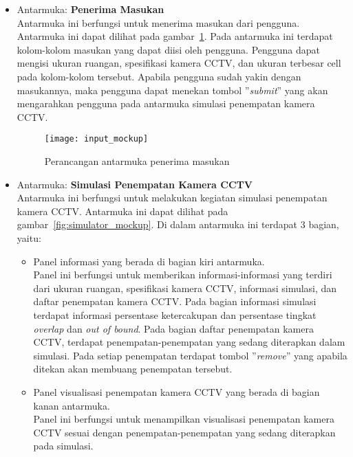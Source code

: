 \begin{itemize}
	\item Antarmuka: \textbf{Penerima Masukan}\\
	Antarmuka ini berfungsi untuk menerima masukan dari pengguna. Antarmuka ini dapat dilihat pada gambar~\ref{fig:input_mockup}. Pada antarmuka ini terdapat kolom-kolom masukan yang dapat diisi oleh pengguna. Pengguna dapat mengisi ukuran ruangan, spesifikasi kamera CCTV, dan ukuran terbesar cell pada kolom-kolom tersebut. Apabila pengguna sudah yakin dengan masukannya, maka pengguna dapat menekan tombol ''\textit{submit}'' yang akan mengarahkan pengguna pada antarmuka simulasi penempatan kamera CCTV.
	\begin{figure}[h]
		\centering  
		\texttt{[image: input\_mockup]}
		\caption[Perancangan antarmuka penerima masukan]{Perancangan antarmuka penerima masukan}
		\label{fig:input_mockup}
	\end{figure}

	\item Antarmuka: \textbf{Simulasi Penempatan Kamera CCTV}\\
	Antarmuka ini berfungsi untuk melakukan kegiatan simulasi penempatan kamera CCTV. Antarmuka ini dapat dilihat pada gambar~\ref{fig:simulator_mockup}. Di dalam antarmuka ini terdapat 3 bagian, yaitu:
	\begin{itemize}
		\item Panel informasi yang berada di bagian kiri antarmuka.\\
		Panel ini berfungsi untuk memberikan informasi-informasi yang terdiri dari ukuran ruangan, spesifikasi kamera CCTV, informasi simulasi, dan daftar penempatan kamera CCTV. Pada bagian informasi simulasi terdapat informasi persentase ketercakupan dan persentase tingkat \textit{overlap} dan \textit{out of bound}. Pada bagian daftar penempatan kamera CCTV, terdapat penempatan-penempatan yang sedang diterapkan dalam simulasi. Pada setiap penempatan terdapat tombol ''\textit{remove}'' yang apabila ditekan akan membuang penempatan tersebut.
		
		\item Panel visualisasi penempatan kamera CCTV yang berada di bagian kanan antarmuka.\\
		Panel ini berfungsi untuk menampilkan visualisasi penempatan kamera CCTV sesuai dengan penempatan-penempatan yang sedang diterapkan pada simulasi.
		

\end{itemize}
\end{itemize}
